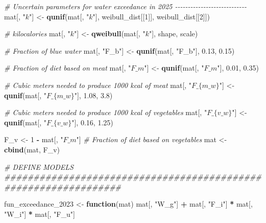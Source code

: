 \documentclass[
  11pt,
]{article}
\newenvironment{Shaded}{\begin{snugshade}}{\end{snugshade}}
\newcommand{\CommentTok}[1]{\textcolor[rgb]{0.56,0.35,0.01}{\textit{#1}}}
\newcommand{\ControlFlowTok}[1]{\textcolor[rgb]{0.13,0.29,0.53}{\textbf{#1}}}
\newcommand{\DecValTok}[1]{\textcolor[rgb]{0.00,0.00,0.81}{#1}}
\newcommand{\FloatTok}[1]{\textcolor[rgb]{0.00,0.00,0.81}{#1}}
\newcommand{\FunctionTok}[1]{\textcolor[rgb]{0.13,0.29,0.53}{\textbf{#1}}}
\newcommand{\NormalTok}[1]{#1}
\newcommand{\OtherTok}[1]{\textcolor[rgb]{0.56,0.35,0.01}{#1}}
\newcommand{\SpecialCharTok}[1]{\textcolor[rgb]{0.81,0.36,0.00}{\textbf{#1}}}
\newcommand{\StringTok}[1]{\textcolor[rgb]{0.31,0.60,0.02}{#1}}
\begin{document}
\begin{Shaded}
\begin{Highlighting}[]
\CommentTok{\# Uncertain parameters for water exceedance in 2025 {-}{-}{-}{-}{-}{-}{-}{-}{-}{-}{-}{-}{-}{-}{-}{-}{-}{-}{-}{-}{-}{-}{-}{-}{-}{-}{-}{-}}
\NormalTok{mat[, }\StringTok{"$k$"}\NormalTok{] }\OtherTok{\textless{}{-}} \FunctionTok{qunif}\NormalTok{(mat[, }\StringTok{"$k$"}\NormalTok{], weibull\_dist[[}\DecValTok{1}\NormalTok{]], weibull\_dist[[}\DecValTok{2}\NormalTok{]])}

\CommentTok{\# kilocalories}
\NormalTok{mat[, }\StringTok{"$k$"}\NormalTok{] }\OtherTok{\textless{}{-}} \FunctionTok{qweibull}\NormalTok{(mat[, }\StringTok{"$k$"}\NormalTok{], shape, scale) }

\CommentTok{\# Fraction of blue water}
\NormalTok{mat[, }\StringTok{"F\_b"}\NormalTok{] }\OtherTok{\textless{}{-}} \FunctionTok{qunif}\NormalTok{(mat[, }\StringTok{"F\_b"}\NormalTok{], }\FloatTok{0.13}\NormalTok{, }\FloatTok{0.15}\NormalTok{) }

\CommentTok{\# Fraction of diet based on meat}
\NormalTok{mat[, }\StringTok{"$F\_m$"}\NormalTok{] }\OtherTok{\textless{}{-}} \FunctionTok{qunif}\NormalTok{(mat[, }\StringTok{"$F\_m$"}\NormalTok{], }\FloatTok{0.01}\NormalTok{, }\FloatTok{0.35}\NormalTok{) }

\CommentTok{\# Cubic meters needed to produce 1000 kcal of meat}
\NormalTok{mat[, }\StringTok{"$F\_\{m\_w\}$"}\NormalTok{] }\OtherTok{\textless{}{-}} \FunctionTok{qunif}\NormalTok{(mat[, }\StringTok{"$F\_\{m\_w\}$"}\NormalTok{], }\FloatTok{1.08}\NormalTok{, }\FloatTok{3.8}\NormalTok{) }

\CommentTok{\# Cubic meters needed to produce 1000 kcal of vegetables}
\NormalTok{mat[, }\StringTok{"$F\_\{v\_w\}$"}\NormalTok{] }\OtherTok{\textless{}{-}} \FunctionTok{qunif}\NormalTok{(mat[, }\StringTok{"$F\_\{v\_w\}$"}\NormalTok{], }\FloatTok{0.16}\NormalTok{, }\FloatTok{1.25}\NormalTok{) }

\NormalTok{F\_v }\OtherTok{\textless{}{-}} \DecValTok{1} \SpecialCharTok{{-}}\NormalTok{ mat[, }\StringTok{"$F\_m$"}\NormalTok{] }\CommentTok{\# Fraction of diet based on vegetables}
\NormalTok{mat }\OtherTok{\textless{}{-}} \FunctionTok{cbind}\NormalTok{(mat, F\_v)}

\CommentTok{\# DEFINE MODELS \#\#\#\#\#\#\#\#\#\#\#\#\#\#\#\#\#\#\#\#\#\#\#\#\#\#\#\#\#\#\#\#\#\#\#\#\#\#\#\#\#\#\#\#\#\#\#\#\#\#\#\#\#\#\#\#\#\#\#\#\#\#\#\#}

\NormalTok{fun\_exceedance\_2023 }\OtherTok{\textless{}{-}} \ControlFlowTok{function}\NormalTok{(mat) mat[, }\StringTok{"W\_g"}\NormalTok{] }\SpecialCharTok{+}\NormalTok{ mat[, }\StringTok{"F\_i"}\NormalTok{] }\SpecialCharTok{*}\NormalTok{ mat[, }\StringTok{"W\_i"}\NormalTok{] }\SpecialCharTok{*}\NormalTok{ mat[, }\StringTok{"F\_u"}\NormalTok{]}



\end{Highlighting}
\end{Shaded}
\end{document}
